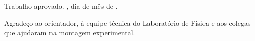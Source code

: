 \documentclass[
  12pt,            %
  oneside,         %
  a4paper,
  english,         %
  brazilian,       %
]{abntex2}
\newif\ifinstrucoes
\newcommand{\instrucao}[1]{\ifinstrucoes{\color{gray}\small\itshape #1\par}\fi}
\begin{document}
\pretextual

\imprimircapa
\imprimirfolhaderosto{}

\begin{folhadeaprovacao}
  \begin{center}
    {\ABNTEXchapterfont\large\imprimirautor}

    \vspace*{\fill}\vspace*{\fill}
    {\ABNTEXchapterfont\bfseries\Large\imprimirtitulo}
    \vspace*{\fill}

    \hspace{.45\textwidth}
    \begin{minipage}{.5\textwidth}
      \imprimirpreambulo
    \end{minipage}%
    \vspace*{\fill}
  \end{center}

  Trabalho aprovado. \imprimirlocal, dia de mês de \imprimirdata.


  \begin{center}
    \vspace*{0.5cm}
    {\large\imprimirlocal}
    \par
    {\large\imprimirdata}
    \vspace*{1cm}
  \end{center}
\end{folhadeaprovacao}

\begin{agradecimentos}
  \instrucao{Opcional. Em poucas linhas, agradeça a quem contribuiu de fato: orientação, técnicos do laboratório, agência de fomento (com o número do processo).}
  Agradeço ao orientador, à equipe técnica do Laboratório de Física e aos colegas que ajudaram na montagem experimental.
\end{agradecimentos}
\end{document}

